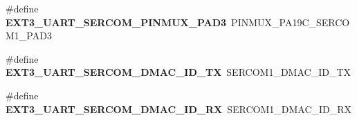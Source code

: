 \begin{DoxyCompactItemize}
\item 
\hypertarget{group__saml21__xplained__pro__features__group_gac8ad1efc6a16fd80d227082ebc261a03}{}\#define {\bfseries E\+X\+T3\+\_\+\+U\+A\+R\+T\+\_\+\+S\+E\+R\+C\+O\+M\+\_\+\+P\+I\+N\+M\+U\+X\+\_\+\+P\+A\+D3}~P\+I\+N\+M\+U\+X\+\_\+\+P\+A19\+C\+\_\+\+S\+E\+R\+C\+O\+M1\+\_\+\+P\+A\+D3\label{group__saml21__xplained__pro__features__group_gac8ad1efc6a16fd80d227082ebc261a03}

\item 
\hypertarget{group__saml21__xplained__pro__features__group_ga9549e7ab457eb822b2c4ee339ff1dde9}{}\#define {\bfseries E\+X\+T3\+\_\+\+U\+A\+R\+T\+\_\+\+S\+E\+R\+C\+O\+M\+\_\+\+D\+M\+A\+C\+\_\+\+I\+D\+\_\+\+T\+X}~S\+E\+R\+C\+O\+M1\+\_\+\+D\+M\+A\+C\+\_\+\+I\+D\+\_\+\+T\+X\label{group__saml21__xplained__pro__features__group_ga9549e7ab457eb822b2c4ee339ff1dde9}

\item 
\hypertarget{group__saml21__xplained__pro__features__group_ga47e31e167cd6339e3e1f88220a7a6b1a}{}\#define {\bfseries E\+X\+T3\+\_\+\+U\+A\+R\+T\+\_\+\+S\+E\+R\+C\+O\+M\+\_\+\+D\+M\+A\+C\+\_\+\+I\+D\+\_\+\+R\+X}~S\+E\+R\+C\+O\+M1\+\_\+\+D\+M\+A\+C\+\_\+\+I\+D\+\_\+\+R\+X\label{group__saml21__xplained__pro__features__group_ga47e31e167cd6339e3e1f88220a7a6b1a}

\end{DoxyCompactItemize}
